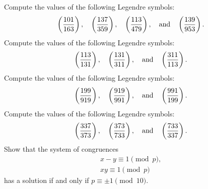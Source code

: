 \exercises

\begin{starter}
  \exercise Compute the values of the following Legendre symbols:
  \begin{equation*}
    \legendre{101}{163}, \quad \legendre{137}{359}, \quad \legendre{113}{479}, \quad\text{and}\quad \legendre{139}{953}.
  \end{equation*}
  \exercise Compute the values of the following Legendre symbols:
  \begin{equation*}
    \legendre{113}{131}, \quad \legendre{131}{311}, \quad\text{and}\quad \legendre{311}{113}.
  \end{equation*}
  \exercise Compute the values of the following Legendre symbols:
  \begin{equation*}
    \legendre{199}{919}, \quad \legendre{919}{991}, \quad\text{and}\quad \legendre{991}{199}.
  \end{equation*}
  \exercise Compute the values of the following Legendre symbols:
  \begin{equation*}
    \legendre{337}{373}, \quad \legendre{373}{733}, \quad\text{and}\quad \legendre{733}{337}.
  \end{equation*}
  \exercise Show that the system of congruences
  \begin{align*}
    x-y\equiv 1\pmod{p},\\
    xy\equiv 1\pmod{p}
  \end{align*}
  has a solution if and only if $p\equiv \pm 1\pmod{10}$.
\end{starter}

